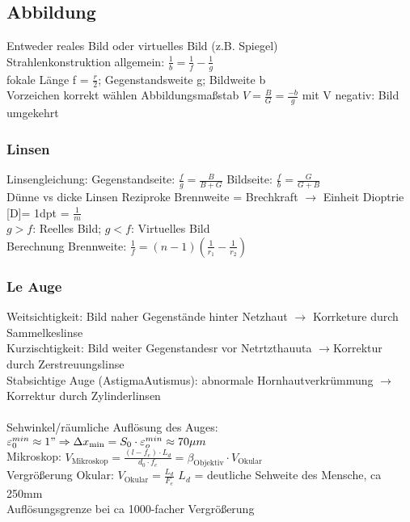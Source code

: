 \documentclass[fs, footer]{latex4ei}
\begin{document}
\begin{multicols*}{4}
\subsection{Abbildung}
Entweder reales Bild oder virtuelles Bild (z.B. Spiegel)\\
Strahlenkonstruktion allgemein: $\frac{1}{b}= \frac{1}{f} - \frac{1}{g}$\\
fokale Länge f = $\frac{r}{2}$; Gegenstandsweite g; Bildweite b\\
Vorzeichen korrekt wählen %
Abbildungsmaßstab $V = \frac{B}{G}=\frac{-b}{g}$ mit V negativ: Bild umgekehrt\\
\subsubsection{Linsen}
Linsengleichung:
Gegenstandseite: $\frac{f}{g} = \frac{B}{B+G}$
Bildseite: $\frac{f}{b}= \frac{G}{G+B}$\\
Dünne vs dicke Linsen
Reziproke Brennweite = Brechkraft $\rightarrow$ Einheit Dioptrie [D]= 1dpt = $\frac{1}{m}$\\
$g>f$: Reelles Bild;
$g<f$: Virtuelles Bild\\
Berechnung Brennweite: $\frac{1}{f}=(n-1)(\frac{1}{r_1}-\frac{1}{r_2})$\\

\subsubsection{Le Auge}
Weitsichtigkeit: Bild naher Gegenstände hinter Netzhaut $\rightarrow$ Korrketure durch Sammelkeslinse\\
Kurzischtigkeit: Bild weiter Gegenstandesr vor Netrtzthauuta $\rightarrow$Korrektur durch Zerstreuungslinse\\
Stabsichtige Auge (AstigmaAutismus): abnormale Hornhautverkrümmung $\rightarrow$Korrektur durch Zylinderlinsen\\
\\Sehwinkel/räumliche Auflösung des Auges: $\varepsilon_0^{min} \approx 1" \Rightarrow \Delta x_{\text{min}} = S_0\cdot\varepsilon_o^{min} \approx 70 \mu m$\\
Mikroskop: $V_{\text{Mikroskop}} = \frac{(l-f_e)\cdot L_d}{d_0\cdot f_e} = \beta_{\text{Objektiv}}\cdot V_{\text{Okular}}$\\
Vergrößerung Okular: $V_{\text{Okular}} = \frac{L_d}{F_e}$ $L_d$ = deutliche Sehweite des Mensche, ca 250mm\\
Auflösungsgrenze bei ca 1000-facher Vergrößerung\\


\end{multicols*}
\end{document}
